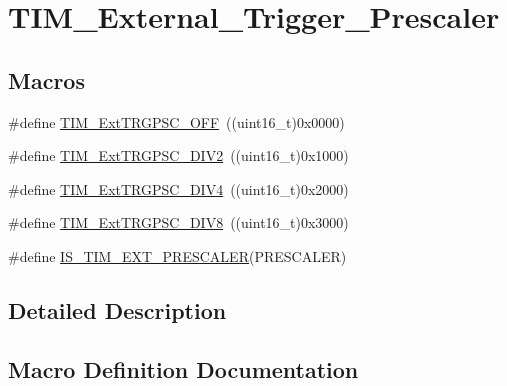 \hypertarget{group___t_i_m___external___trigger___prescaler}{}\section{T\+I\+M\+\_\+\+External\+\_\+\+Trigger\+\_\+\+Prescaler}
\label{group___t_i_m___external___trigger___prescaler}
\subsection*{Macros}
\begin{DoxyCompactItemize}
\item 
\#define \mbox{\hyperlink{group___t_i_m___external___trigger___prescaler_ga1b21757d5d1b708edca7e20481797e96}{T\+I\+M\+\_\+\+Ext\+T\+R\+G\+P\+S\+C\+\_\+\+O\+FF}}~((uint16\+\_\+t)0x0000)
\item 
\#define \mbox{\hyperlink{group___t_i_m___external___trigger___prescaler_ga446ed7f1bc28bcb295c43886da582e47}{T\+I\+M\+\_\+\+Ext\+T\+R\+G\+P\+S\+C\+\_\+\+D\+I\+V2}}~((uint16\+\_\+t)0x1000)
\item 
\#define \mbox{\hyperlink{group___t_i_m___external___trigger___prescaler_ga1de0031af7654fac2f29705f1da146c6}{T\+I\+M\+\_\+\+Ext\+T\+R\+G\+P\+S\+C\+\_\+\+D\+I\+V4}}~((uint16\+\_\+t)0x2000)
\item 
\#define \mbox{\hyperlink{group___t_i_m___external___trigger___prescaler_gac2fe5014d69a93ce0a22b9f3f5a7d19a}{T\+I\+M\+\_\+\+Ext\+T\+R\+G\+P\+S\+C\+\_\+\+D\+I\+V8}}~((uint16\+\_\+t)0x3000)
\item 
\#define \mbox{\hyperlink{group___t_i_m___external___trigger___prescaler_ga615587e6aae397d9fe8166004e7324f2}{I\+S\+\_\+\+T\+I\+M\+\_\+\+E\+X\+T\+\_\+\+P\+R\+E\+S\+C\+A\+L\+ER}}(P\+R\+E\+S\+C\+A\+L\+ER)
\end{DoxyCompactItemize}


\subsection{Detailed Description}


\subsection{Macro Definition Documentation}
\mbox{\label{group___t_i_m___external___trigger___prescaler_ga615587e6aae397d9fe8166004e7324f2}} 
